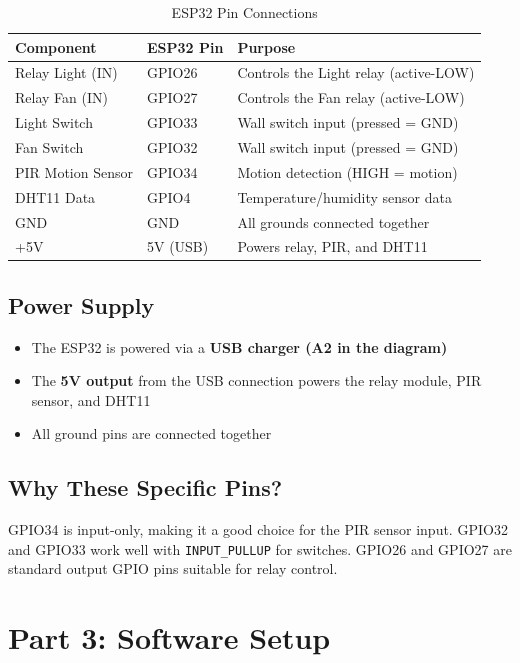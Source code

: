 \documentclass[12pt,a4paper]{article}
\begin{document}
\begin{table}[H]
\centering
\begin{tabularx}{\textwidth}{|l|l|X|}
\hline
\textbf{Component} & \textbf{ESP32 Pin} & \textbf{Purpose} \\
\hline
Relay Light (IN) & GPIO26 & Controls the Light relay (active-LOW) \\
\hline
Relay Fan (IN) & GPIO27 & Controls the Fan relay (active-LOW) \\
\hline
Light Switch & GPIO33 & Wall switch input (pressed = GND) \\
\hline
Fan Switch & GPIO32 & Wall switch input (pressed = GND) \\
\hline
PIR Motion Sensor & GPIO34 & Motion detection (HIGH = motion) \\
\hline
DHT11 Data & GPIO4 & Temperature/humidity sensor data \\
\hline
GND & GND & All grounds connected together \\
\hline
+5V & 5V (USB) & Powers relay, PIR, and DHT11 \\
\hline
\end{tabularx}
\caption{ESP32 Pin Connections}
\label{tab:pins}
\end{table}

\subsection{Power Supply}
\begin{itemize}
\item The ESP32 is powered via a \textbf{USB charger (A2 in the diagram)}
\item The \textbf{5V output} from the USB connection powers the relay module, PIR sensor, and DHT11
\item All ground pins are connected together
\end{itemize}

\subsection{Why These Specific Pins?}
GPIO34 is input-only, making it a good choice for the PIR sensor input. GPIO32 and GPIO33 work well with \texttt{INPUT\_PULLUP} for switches. GPIO26 and GPIO27 are standard output GPIO pins suitable for relay control.

\newpage
\section{Part 3: Software Setup}
\end{document}
